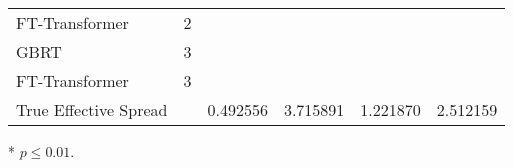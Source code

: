 \begin{threeparttable}
\begin{tabular}{llSSSS@{}}
        \tabindent  FT-Transformer                       & 2    &                                                   & \tnote{*}                                          &          & \tnote{*}       \\
        \tabindent \gls{GBRT}                            & 3    &                                                   & \tnote{*}                                          &          & \tnote{*}       \\
        \tabindent  FT-Transformer                       & 3    &                                                   & \tnote{*}                                          &          & \tnote{*}       \\ \midrule
        True Effective Spread                            &      & 0.492556                                          & 3.715891                                           & 1.221870 & 2.512159        \\ \bottomrule
    \end{tabular}
    \begin{tablenotes}\footnotesize
        \item[*] $p \leq 0.01$.
    \end{tablenotes}
\end{threeparttable}